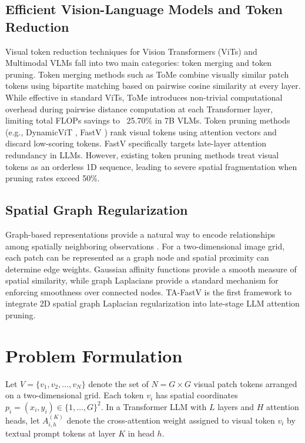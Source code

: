 \documentclass[conference]{IEEEtran}
\begin{document}
\subsection{Efficient Vision-Language Models and Token Reduction}
Visual token reduction techniques for Vision Transformers (ViTs) and Multimodal VLMs fall into two main categories: token merging and token pruning.
Token merging methods such as ToMe \cite{bolya2023tome} combine visually similar patch tokens using bipartite matching based on pairwise cosine similarity at every layer. While effective in standard ViTs, ToMe introduces non-trivial computational overhead during pairwise distance computation at each Transformer layer, limiting total FLOPs savings to ~25.70\% in 7B VLMs.
Token pruning methods (e.g., DynamicViT \cite{rao2021dynamicvit}, FastV \cite{chen2024fastv}) rank visual tokens using attention vectors and discard low-scoring tokens. FastV specifically targets late-layer attention redundancy in LLMs. However, existing token pruning methods treat visual tokens as an orderless 1D sequence, leading to severe spatial fragmentation when pruning rates exceed 50\%.

\subsection{Spatial Graph Regularization}
Graph-based representations provide a natural way to encode relationships among spatially neighboring observations \cite{shuman2013emerging}. For a two-dimensional image grid, each patch can be represented as a graph node and spatial proximity can determine edge weights. Gaussian affinity functions provide a smooth measure of spatial similarity, while graph Laplacians provide a standard mechanism for enforcing smoothness over connected nodes. TA-FastV is the first framework to integrate 2D spatial graph Laplacian regularization into late-stage LLM attention pruning.

\section{Problem Formulation}
Let $V = \{v_1, v_2, \dots, v_N\}$ denote the set of $N = G \times G$ visual patch tokens arranged on a two-dimensional grid. Each token $v_i$ has spatial coordinates $p_i = (x_i, y_i) \in \{1, \dots, G\}^2$. In a Transformer LLM with $L$ layers and $H$ attention heads, let $A_{i, h}^{(K)}$ denote the cross-attention weight assigned to visual token $v_i$ by textual prompt tokens at layer $K$ in head $h$.
\end{document}
